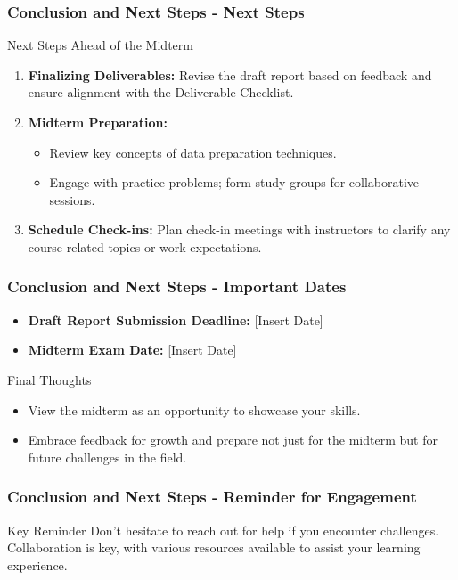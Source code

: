 \documentclass[aspectratio=169]{beamer}
\begin{document}
\begin{frame}[fragile]
    \frametitle{Conclusion and Next Steps - Next Steps}
    \begin{block}{Next Steps Ahead of the Midterm}
        \begin{enumerate}
            \item \textbf{Finalizing Deliverables:} Revise the draft report based on feedback and ensure alignment with the Deliverable Checklist.
            \item \textbf{Midterm Preparation:} 
                \begin{itemize}
                    \item Review key concepts of data preparation techniques.
                    \item Engage with practice problems; form study groups for collaborative sessions.
                \end{itemize}
            \item \textbf{Schedule Check-ins:} Plan check-in meetings with instructors to clarify any course-related topics or work expectations.
        \end{enumerate}
    \end{block}
\end{frame}

\begin{frame}[fragile]
    \frametitle{Conclusion and Next Steps - Important Dates}
    \begin{itemize}
        \item \textbf{Draft Report Submission Deadline:} [Insert Date]
        \item \textbf{Midterm Exam Date:} [Insert Date]
    \end{itemize}
    \begin{block}{Final Thoughts}
        \begin{itemize}
            \item View the midterm as an opportunity to showcase your skills.
            \item Embrace feedback for growth and prepare not just for the midterm but for future challenges in the field.
        \end{itemize}
    \end{block}
\end{frame}

\begin{frame}[fragile]
    \frametitle{Conclusion and Next Steps - Reminder for Engagement}
    \begin{block}{Key Reminder}
        Don't hesitate to reach out for help if you encounter challenges. Collaboration is key, with various resources available to assist your learning experience.
    \end{block}
\end{frame}
\end{document}
